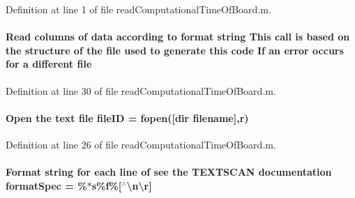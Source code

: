 Definition at line 1 of file read\+Computational\+Time\+Of\+Board.\+m.

\hypertarget{a00114_afb14c82a145a51f20aea2593e1d84b86}{}
\paragraph[{file}]{\setlength{\rightskip}{0pt plus 5cm}Read {\bf columns} of {\bf data} according to format string This call is based on the structure of the file used to generate this code If an error occurs for a different file}\label{a00114_afb14c82a145a51f20aea2593e1d84b86}


Definition at line 30 of file read\+Computational\+Time\+Of\+Board.\+m.

\hypertarget{a00114_a0535e16c4a03a88fd449c86dc20c47c4}{}
\paragraph[{file\+I\+D}]{\setlength{\rightskip}{0pt plus 5cm}Open the {\bf text} {\bf file} file\+I\+D = fopen(\mbox{[}dir {\bf filename}\mbox{]},\textquotesingle{}r\textquotesingle{})}\label{a00114_a0535e16c4a03a88fd449c86dc20c47c4}


Definition at line 26 of file read\+Computational\+Time\+Of\+Board.\+m.

\hypertarget{a00114_ae03fb7cd0dab408f33b554c861354325}{}
\paragraph[{format\+Spec}]{\setlength{\rightskip}{0pt plus 5cm}Format string for each line of see the T\+E\+X\+T\+S\+C\+A\+N documentation format\+Spec = \textquotesingle{}\%$\ast$s\%{\bf f}\%\mbox{[}$^\wedge$\textbackslash{}n\textbackslash{}r\mbox{]}\textquotesingle{}}\label{a00114_ae03fb7cd0dab408f33b554c861354325}


